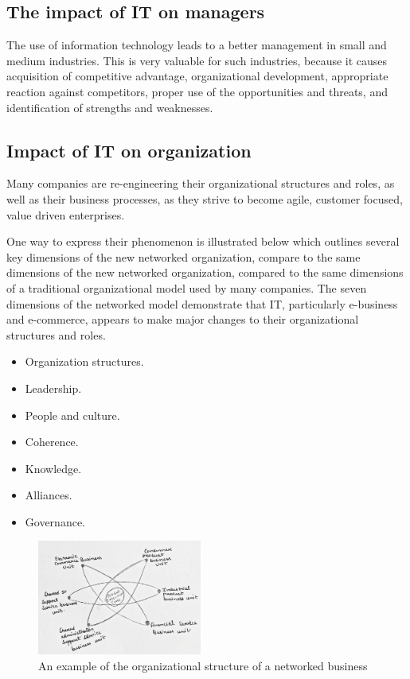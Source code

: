 \documentclass[12pt, a4paper]{article}
\begin{document}
\subsection{The impact of IT on managers}%
The use of information technology leads to a better management in small and
medium industries. This is very valuable for such industries, because it causes
acquisition of competitive advantage, organizational development, appropriate
reaction against competitors, proper use of the opportunities and threats, and
identification of strengths and weaknesses.%

\subsection{Impact of IT on organization}%
Many companies are re-engineering their organizational structures and roles, as
well as their business processes, as they strive to become agile, customer 
focused, value driven enterprises.

One way to express their phenomenon is illustrated below which outlines several
key dimensions of the new networked organization, compare to the same
dimensions of the new networked organization, compared to the same dimensions
of a traditional organizational model used by many companies. The seven 
dimensions of the networked model demonstrate that IT, particularly e-business 
and e-commerce, appears to make major changes to their organizational
structures and roles.
\begin{itemize}
  \item Organization structures.
  \item Leadership.
  \item People and culture.
  \item Coherence.
  \item Knowledge.
  \item Alliances.
  \item Governance.
\end{itemize}
\begin{figure}[h]
  \centering
  \includegraphics[width=0.48\textwidth]{orgstrucofnetbuis}
  \caption{An example of the organizational structure of a networked business}
\end{figure}%
\end{document}
